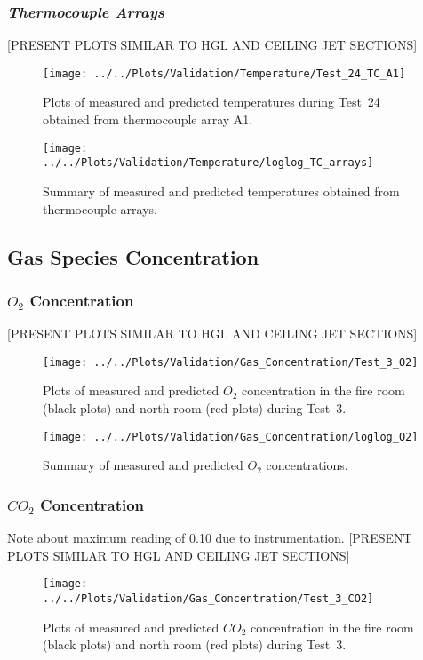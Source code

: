 \clearpage
\subsubsection*{\textit{Thermocouple Arrays}}
[PRESENT PLOTS SIMILAR TO HGL AND CEILING JET SECTIONS]
\begin{figure}[!h]
	\centering
	\texttt{[image: ../../Plots/Validation/Temperature/Test\_24\_TC\_A1]}
	\caption[Plots of measured and predicted thermocouple array temperatures during Test~24.]{Plots of measured and predicted temperatures during Test~24 obtained from thermocouple array A1.}
	\label{fig:TCarray_data}
\end{figure}

\begin{figure}[!h]
	\centering
	\texttt{[image: ../../Plots/Validation/Temperature/loglog\_TC\_arrays]}
	\caption{Summary of measured and predicted temperatures obtained from thermocouple arrays.}
	\label{fig:loglog_TC_arrays}
\end{figure}

\clearpage
\subsection{Gas Species Concentration}

\subsubsection*{\textit{$O_2$} Concentration}
[PRESENT PLOTS SIMILAR TO HGL AND CEILING JET SECTIONS]
\begin{figure}[!h]
	\centering
	\texttt{[image: ../../Plots/Validation/Gas\_Concentration/Test\_3\_O2]}
	\caption[Plots of measured and predicted $O_2$ concentration during Test~3.]{Plots of measured and predicted $O_2$ concentration in the fire room (black plots) and north room (red plots) during Test~3.}
	\label{fig:Test3_O2}
\end{figure}

\begin{figure}[!h]
	\centering
	\texttt{[image: ../../Plots/Validation/Gas\_Concentration/loglog\_O2]}
	\caption{Summary of measured and predicted $O_2$ concentrations.}
	\label{fig:loglog_O2}
\end{figure}

\FloatBarrier
\subsubsection*{\textit{$CO_2$} Concentration}
Note about maximum reading of 0.10 due to instrumentation. [PRESENT PLOTS SIMILAR TO HGL AND CEILING JET SECTIONS]
\begin{figure}[!h]
	\centering
	\texttt{[image: ../../Plots/Validation/Gas\_Concentration/Test\_3\_CO2]}
	\caption[Plots of measured and predicted $CO_2$ concentration during Test~3.]{Plots of measured and predicted $CO_2$ concentration in the fire room (black plots) and north room (red plots) during Test~3.}
	\label{fig:Test3_CO2}
\end{figure}

